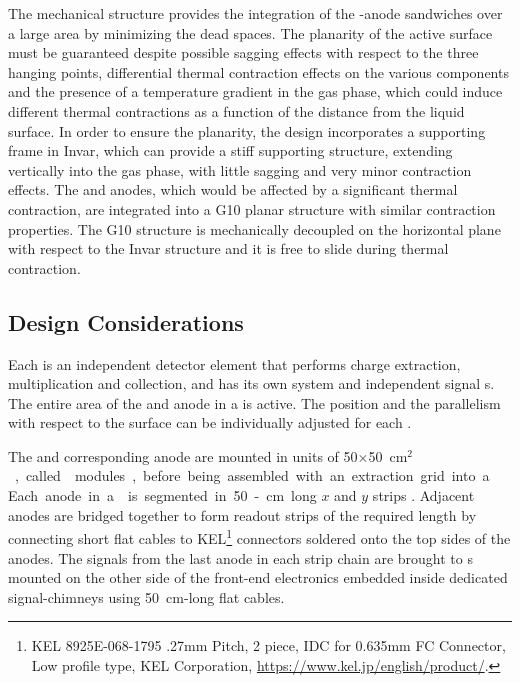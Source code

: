 The  mechanical structure provides the integration of the -anode sandwiches over a large area by minimizing the dead spaces. The planarity of the active surface must be guaranteed despite possible sagging effects with respect to the three hanging points, differential thermal contraction effects on the various  components and the presence of a temperature gradient in the gas phase, which could induce different thermal contractions as a function of the distance from the liquid surface. In order to %
ensure the planarity, the design %
incorporates a supporting frame in Invar, which %
can provide a stiff supporting structure, extending vertically into the gas phase, with little sagging and %
very minor contraction effects. The  and anodes, which would be affected by a significant thermal contraction, are integrated into a G10 planar structure with similar contraction %
properties. The G10 structure is mechanically decoupled on the horizontal plane with respect to the Invar structure  and it is free to slide during thermal contraction. 

\subsection{Design Considerations}
\label{sec:fddp-crp-des-consid}

Each  is an independent detector element that performs charge
extraction, multiplication and collection, and has its own  system and independent signal \fdth{}s. The entire area of the  and anode in a  is active. The position and the parallelism with respect to the \lar surface can be individually adjusted for each .

The  and corresponding anode are mounted in units of \num{50}$\times$\SI{50}{cm$^2$}, called %
 modules, before being assembled with an extraction grid into a . Each anode in a  is segmented in 50-cm long $x$ and $y$ strips . Adjacent  anodes are bridged together to form readout strips of the required length by connecting short flat cables to KEL\footnote{KEL 8925E-068-1795 .27mm Pitch, 2 piece, IDC for 0.635mm FC Connector, Low profile type, KEL Corporation\texttrademark{}, \url{https://www.kel.jp/english/product/}.} connectors soldered onto the top sides of the anodes. The signals from the last anode in each  strip chain are brought to \fdth{}s mounted on the other side of the front-end electronics embedded inside dedicated signal-\fdth chimneys using \SI{50}{cm}-long flat cables.

